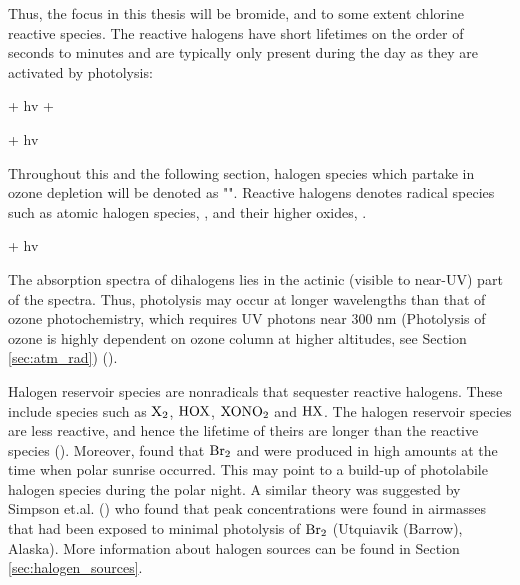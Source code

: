 \medskip

Thus, the focus in this thesis will be bromide, and to some extent chlorine reactive species. The reactive halogens have short lifetimes on the order of seconds to minutes and are typically only present during the day as they are activated by photolysis:



\begin{reaction}
     + hv \rightarrow {} + 
    \label{R:19}
\end{reaction}

\begin{reaction}
     + hv 
\end{reaction}

Throughout this and the following section, halogen species which partake in ozone depletion will be denoted as "". Reactive halogens denotes radical species such as atomic halogen species, , and their higher oxides, . 

\begin{reaction}
     + hv  \label{R:1}
\end{reaction}

The absorption spectra of dihalogens lies in the actinic (visible to near-UV) part of the spectra. Thus, photolysis may occur at longer wavelengths than that of ozone photochemistry, which requires UV photons near 300 nm (Photolysis of ozone is highly dependent on ozone column at higher altitudes, see Section \ref{sec:atm_rad}) (\cite{Simpson2015}).

\medskip

Halogen reservoir species are nonradicals that sequester reactive halogens. These include species such as $\mathrm{X_2}$, $\mathrm{HOX}$, $\mathrm{XONO_2}$ and $\mathrm{HX}$. The halogen reservoir species are less reactive, and hence the lifetime of theirs are longer than the reactive species (\cite{Simpson2015}). Moreover, \cite{Foster2001} found that $\mathrm{Br_2}$ and  were produced in high amounts at the time when polar sunrise occurred. This may point to a build-up of photolabile halogen species during the polar night. A similar theory was suggested by Simpson et.al. (\cite{Simpson2018}) who found that peak  concentrations were found in airmasses that had been exposed to minimal photolysis of $\mathrm{Br_2}$ (Utquiavik (Barrow), Alaska). More information about halogen sources can be found in Section \ref{sec:halogen_sources}. 



